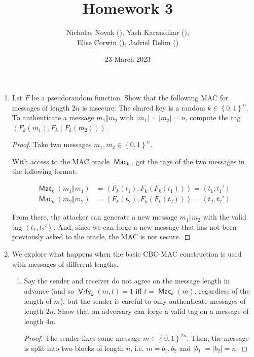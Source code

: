 \documentclass{article}
\title{Homework 3}
\date{23 March 2023}
\author{Nicholas Novak (), Yash Karandikar (),\\
Elise Corwin (), Jadriel Delim ()}
\DeclareMathOperator{\Mac}{\textsf{Mac}}
\DeclareMathOperator{\Vrfy}{\textsf{Vrfy}}
\begin{document}
\maketitle

\begin{enumerate}
  \item Let $F$ be a pseudorandom function. Show that the following MAC for
    messages of length $2n$ is insecure: The shared key is a random $k \in
    \left\{0, 1\right\}^n$. To authenticate a message $m_1 \Vert m_2$ with
    $|m_1| = |m_2| = n$, compute the tag $\left\langle F_k(m_1),
    F_k(F_k(m_2))\right\rangle$.

    \begin{proof}
      Take two messages $m_1, m_2 \in \left\{0, 1\right\}^n$.

      With access to the MAC oracle $\Mac_k$, get the tags of the two messages
      in the following format:

      \begin{align*}
        \Mac_k(m_1 \Vert m_1) &= \left\langle F_k(t_1),
        F_k(F_k(t_1))\right\rangle = \left\langle t_1, t_{1}'\right\rangle\\
        \Mac_k(m_2 \Vert m_2) &= \left\langle F_k(t_2),
        F_k(F_k(t_2))\right\rangle = \left\langle t_2, t_{2}'\right\rangle
      \end{align*}

      From there, the attacker can generate a new message $m_1 \Vert m_2$ with 
      the valid tag $\left\langle t_1, t_{2}'\right\rangle$. And, since we can
      forge a new message that has not been previously asked to the oracle, the 
      MAC is not secure.
    \end{proof}

  \item We explore what happens when the basic CBC-MAC construction is used with
    messages of different lengths.
    \begin{enumerate}
      \item Say the sender and receiver do not agree on the message length in
        advance (and so $\Vrfy_k(m, t) = 1$ iff $t = \Mac_k(m)$, regardless of
        the length of $m$), but the sender is careful to only authenticate
        messages of length $2n$. Show that an adversary can forge a valid tag on
        a message of length $4n$.

        \begin{proof}
          The sender fixes some message $m \in \left\{0, 1\right\}^{2n}$. Then,
          the message is split into two blocks of length $n$, i.e. $m = b_1, b_2$
          and $|b_1| = |b_2| = n$.


\end{proof}
\end{enumerate}
\end{enumerate}
\end{document}

